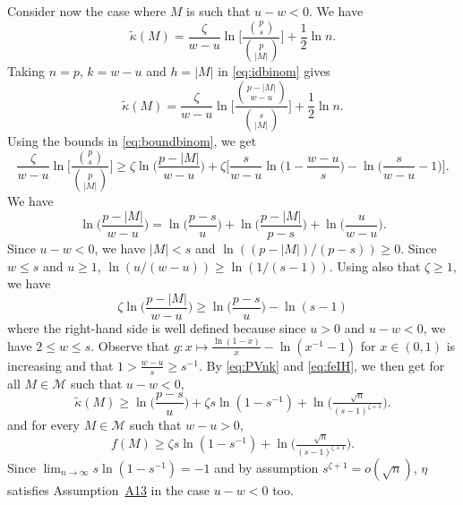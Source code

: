 \documentclass[bj,authoryear]{imsart}
\theoremstyle{plain}
\newcommand{\M}{\mathcal{M}}
\begin{document}
Consider now the case where $M$ is such that $u-w<0$. We have
     \begin{equation*}
        \tilde{\kappa}(M)=\frac{\zeta}{w-u}\ln\Bigg[\frac{\binom{p}{s}}{\binom{p}{|M|}}\Bigg]+ \frac{1}{2}\ln n.
    \end{equation*}
 Taking $n=p$, $k=w-u$ and $h=|M|$ in \eqref{eq:idbinom} gives
     \begin{equation}\label{eq:identitybinom2}
     \tilde{\kappa}(M)=\frac{\zeta}{w-u}\ln\Bigg[\frac{\binom{p - |M|}{w-u}}{\binom{s}{|M|}}\Bigg]+ \frac{1}{2}\ln n.
    \end{equation}
Using the bounds in \eqref{eq:boundbinom}, we get
\begin{equation}\label{eq:PVnk}
    \frac{\zeta}{w-u}\ln\bigg[\frac{\binom{p}{s}}{\binom{p}{|M|}}\bigg] \geq \zeta\ln\bigg(\frac{p-|M|}{w-u}\bigg)+\zeta\bigg[\frac{s}{w-u}\ln\bigg(1-\frac{w-u}{s}\bigg) -\ln\bigg(\frac{s}{w-u}-1\bigg) \bigg].
\end{equation}
We have
$$\ln\bigg(\frac{p-|M|}{w-u}\bigg)=\ln\bigg(\frac{p-s}{u}\bigg)+\ln\bigg(\frac{p-|M|}{p-s}\bigg)+\ln\bigg(\frac{u}{w-u}\bigg).$$
Since $u-w<0$, we have $|M|<s$ and $\ln((p-|M|)/(p-s))\geq 0$. Since $w\leq s$ and $u\geq 1$, $\ln(u/(w-u))\geq\ln(1/(s-1))$. Using also that $\zeta\geq 1$, we have
\begin{equation}\label{eq:feIH}
    \zeta\ln\bigg(\frac{p-|M|}{w-u}\bigg) \geq \ln\bigg(\frac{p-s}{u}\bigg) - \ln(s-1)
\end{equation}
where the right-hand side is well defined because since $u>0$ and $u-w<0$, we have $2\leq w\leq s$. Observe that $g:x \mapsto \frac{\ln(1-x)}{x}-\ln({x}^{-1}-1)$ for $x\in(0,1)$ is increasing and that $1>\frac{w-u}{s} \geq s^{-1}$. By \eqref{eq:PVnk} and \eqref{eq:feIH}, we then get for all $M\in \M$ such that $u-w<0$, 
\begin{equation*}
        \tilde{\kappa}(M) \geq \ln\big(\frac{p-s}{u}\big)+\zeta s\ln(1-s^{-1})+ \ln \big(\tfrac{\sqrt{n}}{(s-1)^{\zeta+1}}\big).
\end{equation*}
and for every $M\in\mathcal{M}$ such that $w-u>0$,
\begin{equation}\label{eq:bounbkappaebicunderfit}
        f(M) \geq \zeta s\ln(1-s^{-1})+ \ln \big(\tfrac{\sqrt{n}}{(s-1)^{\zeta+1}}\big).
\end{equation}
Since $\lim_{n\to\infty}s\ln(1-s^{-1})=-1$ and by assumption $s^{\zeta+1}=o(\sqrt{n})$, $\eta$ satisfies Assumption~\hyperlink{lab:A13}{A13} in the case $u-w<0$ too.
\end{document}

